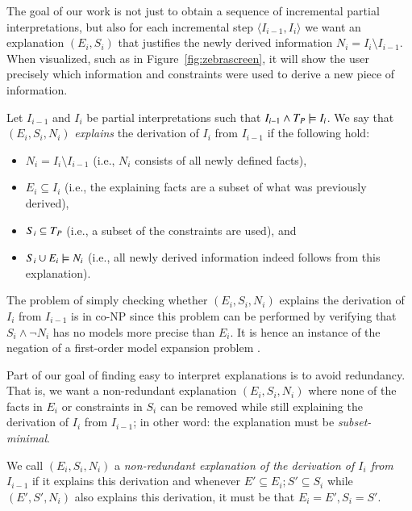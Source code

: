 The goal of our work is not just to obtain a sequence of incremental partial interpretations, but also for each incremental step $\langle I_{i-1}, I_i \rangle$ we want an explanation $(E_i,S_i)$ that justifies the newly derived information $N_i = I_i \setminus I_{i-1}$. When visualized, such as in Figure~\ref{fig:zebrascreen}, it will show the user precisely which information and constraints were used to derive a new piece of information.

\begin{definition}
 Let $I_{i-1}$ and $I_i$ be partial interpretations such that $I_{i-1}\land T_P \models I_i$.
 We say that $(E_i,S_i,N_i)$ \emph{explains} the derivation of $I_{i}$ from $I_{i-1}$ if the following hold:
\begin{itemize}
    \item $N_i= I_i \setminus I_{i-1}$ (i.e., $N_i$ consists of all newly defined facts), 
	\item $E_i\subseteq I_i$ (i.e., the explaining facts are a subset of what was previously derived),
	\item $S_i \subseteq T_P$ (i.e., a subset of the constraints are used), and 
	\item $S_i \cup E_i \models N_i$ (i.e., all newly derived information indeed follows from this explanation).
\end{itemize}
\end{definition}

The problem of simply checking whether $(E_i,S_i,N_i)$ explains the derivation of $I_{i}$ from $I_{i-1}$ is in co-NP since this problem can be performed by verifying that $S_i \land \lnot N_i$ has no models more precise than $E_i$. It is hence an instance of the negation of a first-order model expansion problem \cite{DBLP:conf/lpar/KolokolovaLMT10}.

Part of our goal of finding easy to interpret explanations is to avoid redundancy. 
That is, we want a non-redundant explanation $(E_i,S_i,N_i)$ where none of the facts in $E_i$ or constraints in $S_i$ can be removed while still explaining the derivation of $I_i$ from $I_{i-1}$; in other word: the explanation must be \textit{subset-minimal}. 
\begin{definition}
 We call $(E_i,S_i,N_i)$ a \emph{non-redundant explanation of  the derivation of $I_i$ from $I_{i-1}$} if it explains this derivation and whenever $E'\subseteq E_i; S'\subseteq S_i$ while $(E',S',N_i)$ also explains this derivation, it must be that $E_i=E', S_i=S'$. 
\end{definition}

